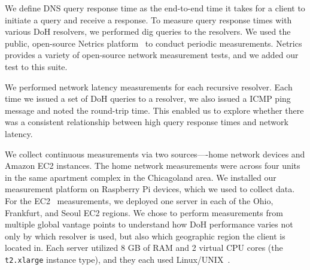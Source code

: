 We define DNS query response time as the
end-to-end time it takes for a client to initiate a query and receive a
response.  To measure query response times with various DoH resolvers, we
performed dig queries to the resolvers. We used the public, open-source Netrics
platform~\cite{netrics} to conduct periodic measurements. Netrics
provides a variety of open-source network measurement tests, and we added our 
test to this suite. 

We performed network latency measurements for each recursive resolver.  Each time
we issued a set of DoH queries to a resolver, we also issued a ICMP ping
message and noted the round-trip time.  This enabled us to explore
whether there was a consistent relationship between high query response times
and network latency.

We collect continuous measurements via two sources—-home network devices and Amazon EC2 instances. The home network measurements were across four units in the same apartment complex in the Chicagoland area. 
We installed our measurement platform on Raspberry Pi devices, which we used to  collect data. 
For the EC2~\cite{amazon_ec2} measurements, we deployed one server
in each of the Ohio, Frankfurt, and Seoul EC2 regions.  We chose to perform
measurements from multiple global vantage points to understand how DoH
performance varies not only by which resolver is used, but also which
geographic region the client is located in.  Each server utilized 8 GB of RAM
and 2 virtual CPU cores (the \texttt{t2.xlarge} instance type), and they each
used Linux/UNIX~\cite{amazon_ec2_instance_types}.

